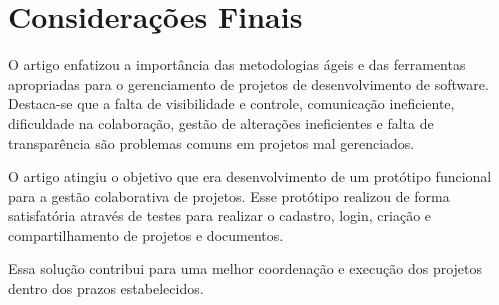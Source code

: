 \section{Considerações Finais}
O artigo enfatizou a importância das metodologias ágeis e das ferramentas apropriadas para o gerenciamento de projetos de desenvolvimento de software. Destaca-se que a falta de visibilidade e controle, comunicação ineficiente, dificuldade na colaboração, gestão de alterações ineficientes e falta de transparência são problemas comuns em projetos mal gerenciados.

O artigo atingiu o objetivo que era  desenvolvimento de um protótipo funcional para a gestão colaborativa de projetos. Esse protótipo realizou de forma satisfatória através de testes para realizar o cadastro, login, criação e compartilhamento de projetos e documentos.

Essa solução contribui para uma melhor coordenação e execução dos projetos dentro dos prazos estabelecidos.
